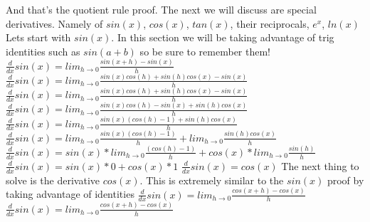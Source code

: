 \documentclass{article}
\begin{document}
And that's the quotient rule proof.
\newline
\newline
The next we will discuss are special derivatives. Namely of $sin(x)$, $cos(x)$, $tan(x)$, their reciprocals, $e^x$, $ln(x)$
\newline
\newline
Lets start with $sin(x)$. In this section we will be taking advantage of trig identities such as $sin(a+b)$ so be sure to remember them!
\newline
\newline
$\frac{d}{dx}sin(x) = lim_{h\to 0} \frac{sin(x+h) - sin(x)}{h}$
\newline
\newline
$\frac{d}{dx}sin(x) = lim_{h\to 0} \frac{sin(x)cos(h) + sin(h)cos(x) - sin(x)}{h}$
\newline
\newline
$\frac{d}{dx}sin(x) = lim_{h\to 0} \frac{sin(x)cos(h) + sin(h)cos(x) - sin(x)}{h}$
\newline
\newline
$\frac{d}{dx}sin(x) = lim_{h\to 0} \frac{sin(x)cos(h) -sin(x)  + sin(h)cos(x) }{h}$
\newline
\newline
$\frac{d}{dx}sin(x) = lim_{h\to 0} \frac{sin(x)(cos(h) - 1)  + sin(h)cos(x) }{h}$
\newline
\newline
$\frac{d}{dx}sin(x) = lim_{h\to 0} \frac{sin(x)(cos(h) - 1)}{h}  + lim_{h\to 0}\frac{sin(h)cos(x)}{h}$
\newline
\newline
$\frac{d}{dx}sin(x) = sin(x) * lim_{h\to 0}  \frac{(cos(h) - 1)}{h}  + cos(x) * lim_{h\to 0}\frac{sin(h)}{h}$
\newline
\newline
$\frac{d}{dx}sin(x) = sin(x) * 0 + cos(x) * 1$
\newline
\newline
$\frac{d}{dx}sin(x) = cos(x)$
\newline
\newline
The next thing to solve is the derivative $cos(x)$. This is extremely similar to the $sin(x)$ proof by taking advantage of identities
\newline
\newline
$\frac{d}{dx} sin(x) =  lim_{h\to 0}\frac{cos(x+h) - cos(x)}{h}$
\newline
\newline
$\frac{d}{dx} sin(x) =  lim_{h\to 0}\frac{cos(x+h) - cos(x)}{h}$
\end{document}
